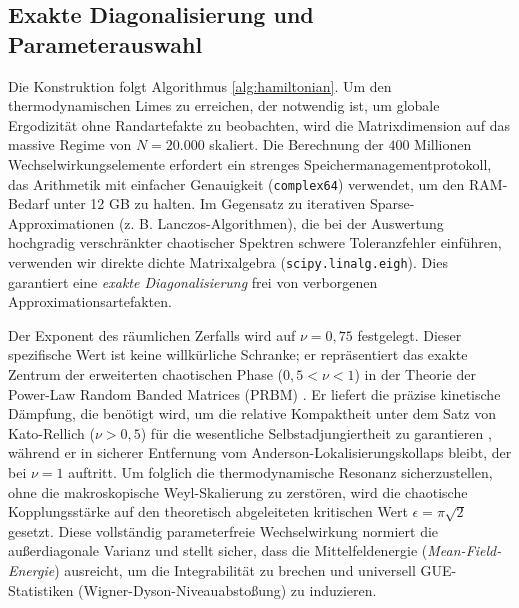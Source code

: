 \documentclass[aps,prl,preprint,superscriptaddress,floatfix]{revtex4-2}
\begin{document}
\subsection{Exakte Diagonalisierung und Parameterauswahl}
Die Konstruktion folgt Algorithmus \ref{alg:hamiltonian}. Um den thermodynamischen Limes zu erreichen, der notwendig ist, um globale Ergodizität ohne Randartefakte zu beobachten, wird die Matrixdimension auf das massive Regime von $N=20.000$ skaliert. Die Berechnung der $400$ Millionen Wechselwirkungselemente erfordert ein strenges Speichermanagementprotokoll, das Arithmetik mit einfacher Genauigkeit (\texttt{complex64}) verwendet, um den RAM-Bedarf unter 12 GB zu halten.
Im Gegensatz zu iterativen Sparse-Approximationen (z. B. Lanczos-Algorithmen), die bei der Auswertung hochgradig verschränkter chaotischer Spektren schwere Toleranzfehler einführen, verwenden wir direkte dichte Matrixalgebra (\texttt{scipy.linalg.eigh}). Dies garantiert eine \textit{exakte Diagonalisierung} frei von verborgenen Approximationsartefakten.

Der Exponent des räumlichen Zerfalls wird auf $\nu = 0,75$ festgelegt. Dieser spezifische Wert ist keine willkürliche Schranke; er repräsentiert das exakte Zentrum der erweiterten chaotischen Phase ($0,5 < \nu < 1$) in der Theorie der Power-Law Random Banded Matrices (PRBM) \cite{Mirlin1996}. Er liefert die präzise kinetische Dämpfung, die benötigt wird, um die relative Kompaktheit unter dem Satz von Kato-Rellich ($\nu > 0,5$) für die wesentliche Selbstadjungiertheit zu garantieren \cite{ReedSimon1975}, während er in sicherer Entfernung vom Anderson-Lokalisierungskollaps bleibt, der bei $\nu = 1$ auftritt. Um folglich die thermodynamische Resonanz sicherzustellen, ohne die makroskopische Weyl-Skalierung zu zerstören, wird die chaotische Kopplungsstärke auf den theoretisch abgeleiteten kritischen Wert $\epsilon = \pi \sqrt{2}$ gesetzt. Diese vollständig parameterfreie Wechselwirkung normiert die außerdiagonale Varianz und stellt sicher, dass die Mittelfeldenergie (\textit{Mean-Field-Energie}) ausreicht, um die Integrabilität zu brechen und universell GUE-Statistiken (Wigner-Dyson-Niveauabstoßung) zu induzieren.
\end{document}
